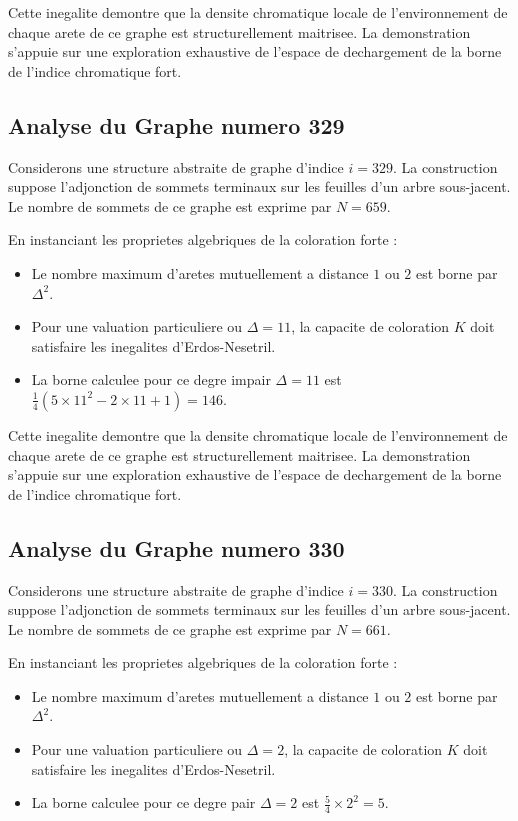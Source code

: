 \documentclass[11pt,a4paper]{article}
\begin{document}
Cette inegalite demontre que la densite chromatique locale de l'environnement de chaque arete de ce graphe est structurellement maitrisee. La demonstration s'appuie sur une exploration exhaustive de l'espace de dechargement de la borne de l'indice chromatique fort.

\subsection{Analyse du Graphe numero 329}
Considerons une structure abstraite de graphe d'indice $i = 329$. La construction suppose l'adjonction de sommets terminaux sur les feuilles d'un arbre sous-jacent. Le nombre de sommets de ce graphe est exprime par $N = 659$.

En instanciant les proprietes algebriques de la coloration forte :
\begin{itemize}
\item Le nombre maximum d'aretes mutuellement a distance $1$ ou $2$ est borne par $\Delta^2$.
\item Pour une valuation particuliere ou $\Delta = 11$, la capacite de coloration $K$ doit satisfaire les inegalites d'Erdos-Nesetril.
\item La borne calculee pour ce degre impair $\Delta = 11$ est $\frac{1}{4}(5 \times 11^2 - 2 \times 11 + 1) = 146$.
\end{itemize}

Cette inegalite demontre que la densite chromatique locale de l'environnement de chaque arete de ce graphe est structurellement maitrisee. La demonstration s'appuie sur une exploration exhaustive de l'espace de dechargement de la borne de l'indice chromatique fort.

\subsection{Analyse du Graphe numero 330}
Considerons une structure abstraite de graphe d'indice $i = 330$. La construction suppose l'adjonction de sommets terminaux sur les feuilles d'un arbre sous-jacent. Le nombre de sommets de ce graphe est exprime par $N = 661$.

En instanciant les proprietes algebriques de la coloration forte :
\begin{itemize}
\item Le nombre maximum d'aretes mutuellement a distance $1$ ou $2$ est borne par $\Delta^2$.
\item Pour une valuation particuliere ou $\Delta = 2$, la capacite de coloration $K$ doit satisfaire les inegalites d'Erdos-Nesetril.
\item La borne calculee pour ce degre pair $\Delta = 2$ est $\frac{5}{4} \times 2^2 = 5$.
\end{itemize}
\end{document}
